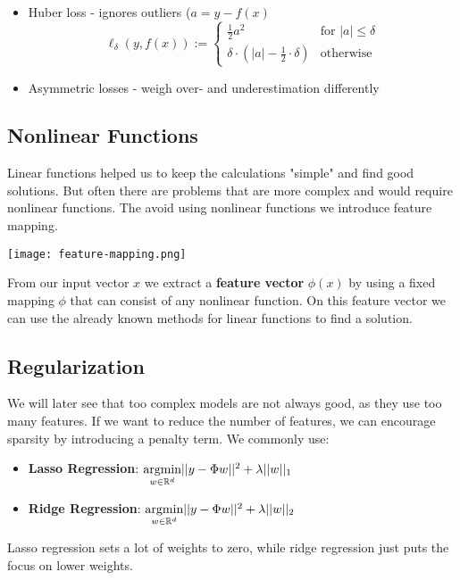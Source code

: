 \begin{itemize}
	\item Huber loss - ignores outliers ($a = y - f(x)$
		$$\ell_\delta(y, f(x)) := \begin{cases}
			\frac{1}{2} a^2 & \text{for } |a| \leq \delta \\
			\delta \cdot (|a| - \frac{1}{2} \cdot \delta) & \text{otherwise}
		\end{cases}$$
	\item Asymmetric losses - weigh over- and underestimation differently
\end{itemize}

\subsection{Nonlinear Functions}

Linear functions helped us to keep the calculations "simple" and find good solutions. But often there are problems that are more complex and would require nonlinear functions. The avoid using nonlinear functions we introduce feature mapping. 

\texttt{[image: feature-mapping.png]}

From our input vector $x$ we extract a \textbf{feature vector} $\phi(x)$ by using a fixed mapping $\phi$ that can consist of any nonlinear function. On this feature vector we can use the already known methods for linear functions to find a solution.

\subsection{Regularization}

We will later see that too complex models are not always good, as they use too many features. If we want to reduce the number of features, we can encourage sparsity by introducing a penalty term. We commonly use:
\begin{itemize}
	\item \textbf{Lasso Regression}: $\underset{w \in \mathbb{R}^d}{\text{argmin}} ||y - \Phi w||^2 + \lambda ||w||_1$
	\item \textbf{Ridge Regression}: $\underset{w \in \mathbb{R}^d}{\text{argmin}} ||y - \Phi w||^2 + \lambda ||w||_2$
\end{itemize}

Lasso regression sets a lot of weights to zero, while ridge regression just puts the focus on lower weights.